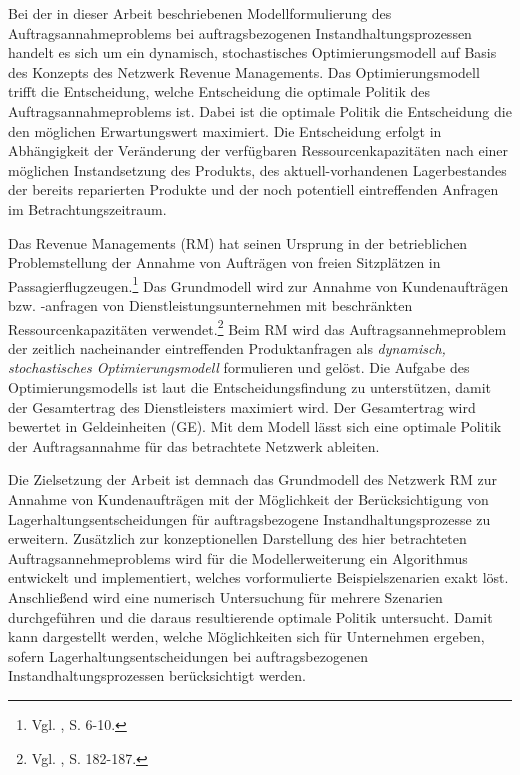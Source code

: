Bei der in dieser Arbeit beschriebenen Modellformulierung des Auftragsannahmeproblems bei auftragsbezogenen Instandhaltungsprozessen handelt es sich um ein dynamisch, stochastisches Optimierungsmodell auf Basis des Konzepts des Netzwerk Revenue Managements. Das Optimierungsmodell trifft die Entscheidung, welche Entscheidung die optimale Politik des Auftragsannahmeproblems ist. Dabei ist die optimale Politik die Entscheidung die den möglichen Erwartungswert maximiert. Die Entscheidung erfolgt in Abhängigkeit der Veränderung der verfügbaren Ressourcenkapazitäten nach einer möglichen Instandsetzung des Produkts, des aktuell-vorhandenen Lagerbestandes der bereits reparierten Produkte und der noch potentiell eintreffenden Anfragen im Betrachtungszeitraum.

Das Revenue Managements (RM) hat seinen Ursprung in der betrieblichen Problemstellung der Annahme von Aufträgen von freien Sitzplätzen in Passagierflugzeugen.\footnote{Vgl. \cite{talluri2004theory}, S. 6-10.} Das Grundmodell wird zur Annahme von Kundenaufträgen bzw. -anfragen von Dienstleistungsunternehmen mit beschränkten Ressourcenkapazitäten verwendet.\footnote{Vgl. \cite{Petrick:2009aa}, S. 182-187.} %
Beim RM wird das Auftragsannehmeproblem der zeitlich nacheinander eintreffenden Produktanfragen als \textit{dynamisch, stochastisches Optimierungsmodell} formulieren und gelöst.
Die Aufgabe des Optimierungsmodells ist laut \cite{talluri2004theory} die Entscheidungsfindung zu unterstützen, damit der Gesamtertrag des Dienstleisters maximiert wird. Der Gesamtertrag wird bewertet in Geldeinheiten (GE). Mit dem Modell lässt sich eine optimale Politik der Auftragsannahme für das betrachtete Netzwerk ableiten.


Die Zielsetzung der Arbeit ist demnach das Grundmodell des Netzwerk RM zur Annahme von Kundenaufträgen mit der Möglichkeit der Berücksichtigung von Lagerhaltungsentscheidungen für auftragsbezogene Instandhaltungsprozesse zu erweitern. Zusätzlich zur konzeptionellen Darstellung des hier betrachteten Auftragsannehmeproblems wird für die Modellerweiterung ein Algorithmus entwickelt und implementiert, welches vorformulierte Beispielszenarien exakt löst. Anschließend wird eine numerisch Untersuchung für mehrere Szenarien durchgeführen und die daraus resultierende optimale Politik untersucht. Damit kann dargestellt werden, welche Möglichkeiten sich für Unternehmen ergeben, sofern Lagerhaltungsentscheidungen bei auftragsbezogenen Instandhaltungsprozessen berücksichtigt werden.

